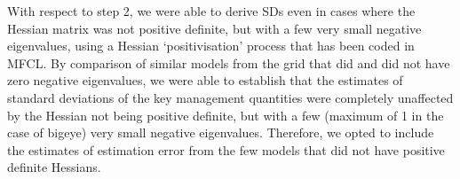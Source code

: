 With respect to step 2, we were able to derive SDs even in cases where the Hessian matrix was not positive definite, but with a few very small negative eigenvalues, using a Hessian `positivisation' process that has been coded in MFCL. By comparison of similar models from the grid that did and did not have zero negative eigenvalues, we were able to establish that the estimates of standard deviations of the key management quantities were completely unaffected by the Hessian not being positive definite, but with a few (maximum of 1 in the case of bigeye) very small negative eigenvalues. Therefore, we opted to include the estimates of estimation error from the few models that did not have positive definite Hessians.
